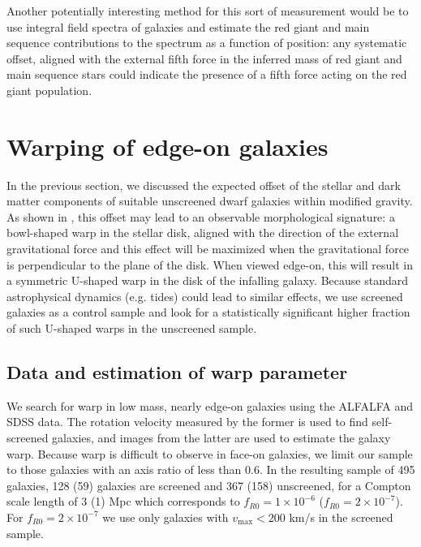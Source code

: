 \documentclass[useAMS,usenatbib,twocolumn]{mn2e}
\newcommand{\jakesays}[1]{{\color{red}[Jake says: #1]}}
\newcommand{\vinusays}[1]{{\color{blue}[Vinu says: #1]}}
\begin{document}
Another potentially interesting method 
for this sort of measurement would be to use integral field
spectra of galaxies and estimate the red giant and main sequence contributions
to the spectrum as a function of position: any systematic offset, aligned with
the external fifth force in the inferred mass of red giant and main sequence
stars could indicate the presence of a fifth force acting on the red giant
population.




\section{Warping of edge-on galaxies}
\label{sec:warp}

In the previous section, we discussed the expected offset of the stellar
and dark matter components of suitable unscreened dwarf galaxies within
modified gravity.  As shown in \citet{bhuvjake2011}, this offset may lead
to an observable morphological signature: a bowl-shaped warp in the stellar
disk, aligned with the direction of the external gravitational force and this
effect will be maximized when the gravitational
force is perpendicular to the plane of the disk. When viewed edge-on,
this will result in a symmetric U-shaped warp in the disk of the infalling
galaxy.  Because standard astrophysical dynamics (e.g. tides) could lead to
similar effects, we use screened galaxies as a control sample and look for
a statistically significant higher fraction of such U-shaped warps in the
unscreened sample.

\subsection{Data and estimation of warp parameter}
We search for warp in low mass, nearly edge-on galaxies using the
ALFALFA and SDSS data. The rotation velocity measured by the former is used to
find self-screened galaxies, and images from the latter are
used to estimate the galaxy warp.
Because warp is difficult to observe in face-on
galaxies, we limit our sample to those galaxies with an axis ratio
of less than 0.6. In the resulting sample of 495 galaxies, 128 (59) 
galaxies are screened and 367 (158) unscreened, for a Compton scale length of 3
(1) Mpc which corresponds to $f_{R0}=1 \times 10^{-6}$ ($f_{R0}=2 \times
10^{-7}$). For $f_{R0}=2 \times 10^{-7}$ we use only galaxies with
$v_\mathrm{max} < 200$ km/s in the screened sample.
\end{document}
